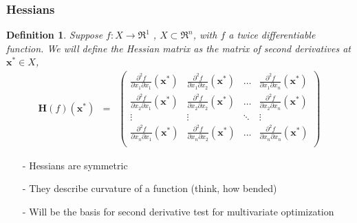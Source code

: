 \documentclass{beamer}
\newtheorem{defn}{Definition}
\numberwithin{equation}{section}
\begin{document}
\begin{frame}
\frametitle{Hessians}


\begin{defn}
Suppose $f:X \rightarrow \Re^{1}$ , $X \subset \Re^{n}$, with $f$ a twice differentiable function.  We will define the \alert{Hessian} matrix as the matrix of second derivatives at $\boldsymbol{x}^{*} \in X$,
\begin{eqnarray}
\boldsymbol{H}(f)(\boldsymbol{x}^{*} )  & = & \begin{pmatrix} 
		\frac{\partial^{2} f }{\partial x_{1} \partial x_{1} } (\boldsymbol{x}^{*} ) & \frac{\partial^{2} f }{\partial x_{1} \partial x_{2} } (\boldsymbol{x}^{*} ) & \hdots & \frac{\partial^{2} f }{\partial x_{1} \partial x_{n} } (\boldsymbol{x}^{*} ) \\
		\frac{\partial^{2} f }{\partial x_{2} \partial x_{1} } (\boldsymbol{x}^{*} ) & \frac{\partial^{2} f }{\partial x_{2} \partial x_{2} } (\boldsymbol{x}^{*} ) & \hdots & \frac{\partial^{2} f }{\partial x_{2} \partial x_{n} } (\boldsymbol{x}^{*} ) \\
		\vdots & \vdots & \ddots & \vdots \\
		\frac{\partial^{2} f }{\partial x_{n} \partial x_{1} } (\boldsymbol{x}^{*} ) & \frac{\partial^{2} f }{\partial x_{n} \partial x_{2} } (\boldsymbol{x}^{*} ) & \hdots & \frac{\partial^{2} f }{\partial x_{n} \partial x_{n} } (\boldsymbol{x}^{*} ) \\
\end{pmatrix} \nonumber 
\end{eqnarray}

\end{defn}		

\begin{itemize}
\item[-] Hessians are \alert{symmetric}
\item[-] They describe \alert{curvature} of a function (think, how bended)
\item[-] Will be the basis for second derivative test for multivariate optimization
\end{itemize}

											

\end{frame}
\end{document}
